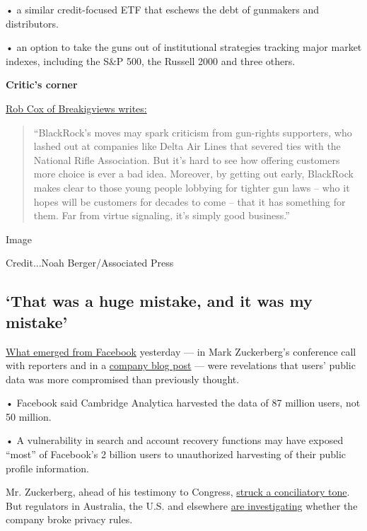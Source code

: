 • a similar credit-focused ETF that eschews the debt of gunmakers and
distributors.

• an option to take the guns out of institutional strategies tracking
major market indexes, including the S\&P 500, the Russell 2000 and three
others.

\textbf{Critic's corner}

\href{https://www.nytimes3xbfgragh.onion/2018/04/05/business/dealbook/blackrock-guns.html}{Rob
Cox of Breakigviews writes:}

\begin{quote}
``BlackRock's moves may spark criticism from gun-rights supporters, who
lashed out at companies like Delta Air Lines that severed ties with the
National Rifle Association. But it's hard to see how offering customers
more choice is ever a bad idea. Moreover, by getting out early,
BlackRock makes clear to those young people lobbying for tighter gun
laws -- who it hopes will be customers for decades to come -- that it
has something for them. Far from virtue signaling, it's simply good
business.''
\end{quote}

Image

Credit...Noah Berger/Associated Press

\hypertarget{that-was-a-huge-mistake-and-it-was-my-mistake}{%
\subsection{`That was a huge mistake, and it was my
mistake'}\label{that-was-a-huge-mistake-and-it-was-my-mistake}}

\href{https://www.nytimes3xbfgragh.onion/2018/04/04/technology/mark-zuckerberg-testify-congress.html?dlbk}{What
emerged from Facebook} yesterday --- in Mark Zuckerberg's conference
call with reporters and in a
\href{https://newsroom.fb.com/news/2018/04/restricting-data-access/}{company
blog post} --- were revelations that users' public data was more
compromised than previously thought.

• Facebook said Cambridge Analytica harvested the data of 87 million
users, not 50 million.

• A vulnerability in search and account recovery functions may have
exposed ``most'' of Facebook's 2 billion users to unauthorized
harvesting of their public profile information.

Mr. Zuckerberg, ahead of his testimony to Congress,
\href{https://www.cnbc.com/2018/04/04/mark-zuckerberg-facebook-user-privacy-issues-my-mistake.html}{struck
a conciliatory tone}. But regulators in Australia, the U.S. and
elsewhere
\href{https://www.wsj.com/articles/mark-zuckerberg-to-testify-before-house-committee-on-april-11-1522844990}{are
investigating} whether the company broke privacy rules.

